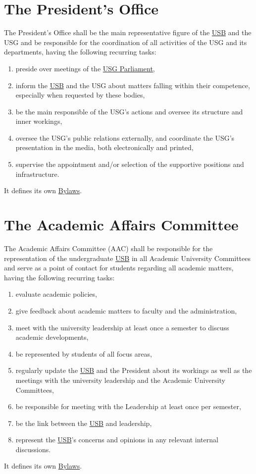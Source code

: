 \documentclass[12pt]{LaTeX_Misc/constitution}
\begin{document}
\section{The President's Office} 
\label{PresidentOfficeDef}
The President's Office shall be the main representative figure of the \hyperref[studentbody]{USB} and the USG and be responsible for the coordination of all activities of the USG and its departments, having the following recurring tasks:
\begin{enumerate}
\item preside over meetings of the \hyperref[USGParliamentDef]{USG Parliament},
\item inform the \hyperref[studentbody]{USB} and the USG about matters falling within their competence, especially when requested by these bodies,
\item be the main responsible of the USG's actions and oversee its structure and inner workings,
\item oversee the USG's public relations externally, and coordinate the USG's presentation in the media, both electronically and printed,
\item supervise the appointment and/or selection of the supportive positions and infrastructure.
\end{enumerate}
It defines its own \hyperref[PresByLawsDef]{Bylaws}.

\section{The Academic Affairs Committee}
\label{AACdef}
The Academic Affairs Committee (AAC) shall be responsible for the representation of the undergraduate \hyperref[studentbody]{USB} in all Academic University Committees and serve as a point of contact for students regarding all academic matters, having the following recurring tasks:
\begin{enumerate}
\item evaluate academic policies,
\item give feedback about academic matters to faculty and the administration,
\item meet with the university leadership at least once a semester to discuss academic developments,
\item be represented by students of all focus areas,
\item regularly update the \hyperref[studentbody]{USB} and the President about its workings as well as the meetings with the university leadership and the Academic University Committees,
\item be responsible for meeting with the Leadership at least once per semester,
\item be the link between the \hyperref[studentbody]{USB} and leadership,
\item represent the \hyperref[studentbody]{USB}'s concerns and opinions in any relevant internal discussions.
\end{enumerate}
It defines its own \hyperref[AACByLawsdef]{Bylaws}.
\end{document}

